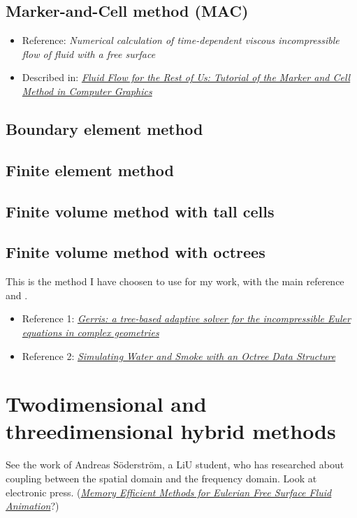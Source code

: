 \subsection{Marker-and-Cell method (MAC)}

\begin{itemize}
    \item Reference: \textit{Numerical calculation of time-dependent viscous incompressible flow of fluid with a free surface}
    \item Described in: \textit{\href{http://people.sc.fsu.edu/~jburkardt/pdf/fluid_flow_for_the_rest_of_us.pdf}{Fluid Flow for the Rest of Us: Tutorial of the Marker and Cell Method in Computer Graphics}}
\end{itemize}

\subsection{Boundary element method}

\subsection{Finite element method}

\subsection{Finite volume method with tall cells}

\subsection{Finite volume method with octrees}

This is the method I have choosen to use for my work, with the main reference \citealp{Losasso2004} and \citep{Popinet2003}.

\begin{itemize}
    \item Reference 1: \textit{\href{http://gfs.sourceforge.net/gerris.pdf}{Gerris: a tree-based adaptive solver for the incompressible Euler equations in complex geometries}}
    \item Reference 2: \textit{\href{http://physbam.stanford.edu/~fedkiw/papers/stanford2004-02.pdf}{Simulating Water and Smoke with an Octree Data Structure}}
\end{itemize}

\section{Twodimensional and threedimensional hybrid methods}

See the work of Andreas Söderström, a LiU student, who has researched about coupling between the spatial domain and the frequency domain. Look at electronic press. (\textit{\href{http://liu.diva-portal.org/smash/get/diva2:359805/FULLTEXT01}{Memory Efficient Methods for Eulerian Free Surface Fluid Animation}}?)